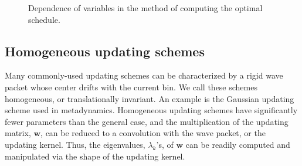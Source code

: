 \documentclass[reprint, floatfix]{revtex4-1}
\newcommand{\Err}{E}
\begin{document}
\begin{figure}
\caption{
  \label{fig:vardep}
  Dependence of variables in the method of computing
  the optimal schedule.
}
\end{figure}


\subsection{\label{sec:band-matrix}
Homogeneous updating schemes}



Many commonly-used updating schemes
can be characterized by a rigid wave packet
whose center drifts with the current bin.
%
We call these schemes homogeneous,
or translationally invariant.
%
An example is the Gaussian updating scheme
used in metadynamics.
%
Homogeneous updating schemes have significantly fewer
parameters than the general case,
and the multiplication of the updating matrix,
$\mathbf w$,
can be reduced to a convolution with the wave packet,
or the updating kernel.
%
Thus,
the eigenvalues, $\lambda_k$'s, of $\mathbf w$
can be readily computed and manipulated
via the shape of the updating kernel.
\end{document}
